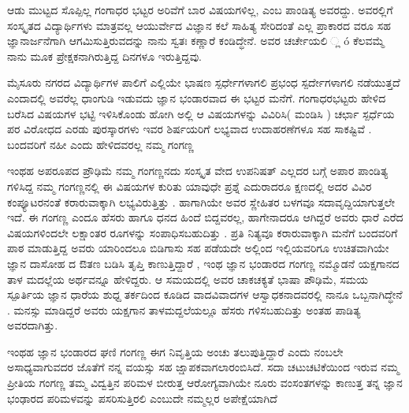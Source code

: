 ಆಡು ಮುಟ್ಟದ ಸೊಪ್ಪಿಲ್ಲ ಗಂಗಾಧರ ಭಟ್ಟರ ಅರಿವೆಗೆ ಬಾರ ವಿಷಯಗಳಿಲ್ಲ, ಎಂಬ ಪಾಂಡಿತ್ಯ ಅವರದ್ದು.  ಅವರಲ್ಲಿಗೆ ಸಂಸ್ಕೃತದ ವಿದ್ಯಾರ್ಥಿಗಳು ಮಾತ್ರವಲ್ಲ  ಆಯುರ್ವೇದ ವಿಜ್ಞಾನ ಕಲೆ ಸಾಹಿತ್ಯ ಸೇರಿದಂತೆ  ಎಲ್ಲ ಪ್ರಾಕಾರದ ವರೂ ಸಹ ಜ್ಞಾನಾರ್ಜನೆಗಾಗಿ ಆಗಮಿಸುತ್ತಿರುವದನ್ನು ನಾನು ಸ್ವತಃ ಕಣ್ಣಾರೆ  ಕಂಡಿದ್ಧೇನೆ. ಅವರ ಚರ್ಚೇಯಲಿ ್ಲ ó ಕೆಲವಮ್ಮೆ ನಾನು  ಮೂಕ ಪ್ರೇಕ್ಷಕನಾಗಿರುತ್ತಿದ್ದ ದಿನಗಳೂ ಇರುತ್ತಿದ್ದವು.

ಮೈಸೂರು ನಗರದ ವಿದ್ಯಾರ್ಥಿಗಳ ಪಾಲಿಗೆ ಎಲ್ಲಿಯೇ ಭಾಷಣ ಸ್ಪರ್ಧೇಗಳಾಗಲಿ  ಪ್ರಭಂಧ ಸ್ಪರ್ದೇಗಳಾಗಲಿ  ನಡೆಯುತ್ತದೆ ಎಂದಾದಲ್ಲಿ   ಅವರೆಲ್ಲ ಧಾಂಗುಡಿ ಇಡುವದು ಜ್ಞಾನ ಭಂಡಾರವಾದ ಈ ಭಟ್ಟರ ಮನೆಗೆ.  ಗಂಗಾಧರಭಟ್ಟರು ಹೇಳಿದ  ಬರೆಸಿದ ವಿಷಯಗಳ ಭಟ್ಟಿ ಇಳಿಸಿಕೊಂಡು ಹೋಗಿ   ಅಲ್ಲಿ ಆ ವಿಷಯಗಳನ್ನು ವಿವಿರಿಸಿ( ಮಂಡಿಸಿ )   ಚರ್ಛಾ ಸ್ಪರ್ಧೆಯ ಪರ ವಿರೋಧದ ಎರಡು ಪುರಸ್ಕಾರಗಳು ಇವರ ಶಿರ್ಷಯರಿಗೆ ಲಭ್ಯವಾದ ಉದಾಹರಣೆಗಳೂ ಸಹ ಸಾಕಷ್ಟಿವೆ . ಬಂದವರಿಗೆ ನಹೀ ಎಂದು ಹೇಳಿದವರಲ್ಲ ನಮ್ಮ ಗಂಗಣ್ಣ  

ಇಂಥಹ ಅಪರೂಪದ ಪ್ರೌಢಿಮೆ ನಮ್ಮ ಗಂಗಣ್ಣನದು  ಸಂಸ್ಕೃತ ವೇದ ಉಪನಿಷತ್ ಎಲ್ಲದರ ಬಗ್ಗೆ ಅಪಾರ ಪಾಂಡಿತ್ಯ ಗಳಿಸಿದ್ದ ನಮ್ಮ ಗಂಗಣ್ಣನಲ್ಲಿ ಈ ವಿಷಯಗಳ ಕುರಿತು ಯಾವುಧೇ ಪ್ರಶ್ನೆ ಎದುರಾದರೂ ಕ್ಷಣದಲ್ಲಿ ಅದರ ವಿವಿರ ಕಂಪ್ಯೂಟರನಂತೆ ಕರಾರುವಾಕ್ಕಾಗಿ ಲಭ್ಯವಿರುತ್ತಿತ್ತು . ಹಾಗಾಗಿಯೇ ಅವರ ಸ್ಣೇಹಿತರ ಬಳಗವೂ ಸದಾವೃದ್ದಿಯಾಗುತ್ತಲೇ ಇದೆ.  ಈ ಗಂಗಣ್ಣ ಎಂದೂ ಹೆಸರು ಹಾಗೂ ಧನದ ಹಿಂದೆ ಬಿದ್ದವರಲ್ಲ, ಹಾಗೇನಾದರೂ ಆಗಿದ್ದರೆ ಅವರು ಧಾರೆ ಎರೆದ  ವಿಷಯಗಳಿಂದಲೇ  ಲಕ್ಷಾಂತರ ರೂಗಳನ್ನು ಸಂಪಾಧಿಸಬಹುದಿತ್ತು . ಪ್ರತಿ ನಿತ್ಯವೂ ಕರಾರುವಾಕ್ಕಾಗಿ ಮನೆಗೆ ಬಂದವರಿಗೆ ಪಾಠ ಮಾಡುತ್ತಿದ್ದ ಅವರು ಯಾರಿಂದಲೂ ಬಿಡಿಗಾಸು ಸಹ ಪಡೆಯದೇ ಅಲ್ಲಿಂದ ಇಲ್ಲಿಯವರಿಗೂ ಉಚಿತವಾಗಿಯೇ ಜ್ಞಾನ ದಾಸೋಹ ದ ಔತಣ  ಬಡಿಸಿ ತೃಪ್ತಿ ಕಾಣುತ್ತಿದ್ದಾರೆ ,    ಇಂಥ ಜ್ಞಾನ ಭಂಡಾರದ ಗಂಗಣ್ಣ  ನಮ್ಮೊಡನೆ ಯಕ್ಷಗಾನದ ತಾಳ ಮದಲ್ಲೆಯ ಅರ್ಥವನ್ನೂ ಹೇಳಿದ್ದರು.  ಆ ಸಮಯದಲ್ಲಿ ಅವರ ಚಾಕಚಕ್ಯತೆ ಭಾಷಾ ಪೌಢಿಮೆ, ಸಮಯ ಸ್ಪೂರ್ತಿಯ ಜ್ಞಾನ ಧಾರೆಯ ಶುಧ್ದ ತರ್ಕದಿಂದ ಕೂಡಿದ  ವಾದವಿವಾದಗಳ ಆಸ್ವಾಧಕನಾದವರಲ್ಲಿ ನಾನೂ ಒಬ್ಬನಾಗಿದ್ಧೇನೆ . ಮನಸ್ಸು ಮಾಡಿದ್ದರೆ ಅವರು ಯಕ್ಷಗಾನ ತಾಳಮದ್ದಲೆಯಲ್ಲೂ ಹೆಸರು ಗಳಿಸಬಹುದಿತ್ತು ಅಂತಹ ಪಾಡಿತ್ಯ ಅವರದಾಗಿತ್ತು.  

ಇಂಥಹ ಜ್ಞಾನ ಭಂಡಾರದ ಘಣಿ ಗಂಗಣ್ಣ ಈಗ ನಿವೃತ್ತಿಯ ಅಂಚು ತಲುಪುತ್ತಿದ್ದಾರೆ ಎಂದು ನಂಬಲೇ ಅಸಾಧ್ಯವಾಗುವದರ ಜೊತೆಗೆ ನನ್ನ ವಯಸ್ಸು  ಸಹ ಜ್ಷಾಪಕವಾಗಲಾರಂಬಿಸಿದೆ. ಸದಾ ಚಟುಚಟಿಕೆಯಿಂದ ಇರುವ ನಮ್ಮ ಪ್ರೀತಿಯ ಗಂಗಣ್ಣ    ತಮ್ಮ ವಿದ್ವತ್ತಿನ ಪರಿಮಳ ಬೀರುತ್ತ  ಆರೋಗ್ಯವಾಗಿಯೇ  ನೂರು ವಂಸಂತಗಳನ್ನು  ಕಾಣುತ್ತ  ತನ್ನ ಜ್ಞಾನ ಭಂಢಾರದ ಪರಿಮಳವನ್ನು ಪಸರಿಸುತ್ತಿರಲಿ ಎಂಬುದೇ ನಮ್ಮಲ್ಲರ ಅಪೇಕ್ಷೆಯಾಗಿದೆ


\articleend
